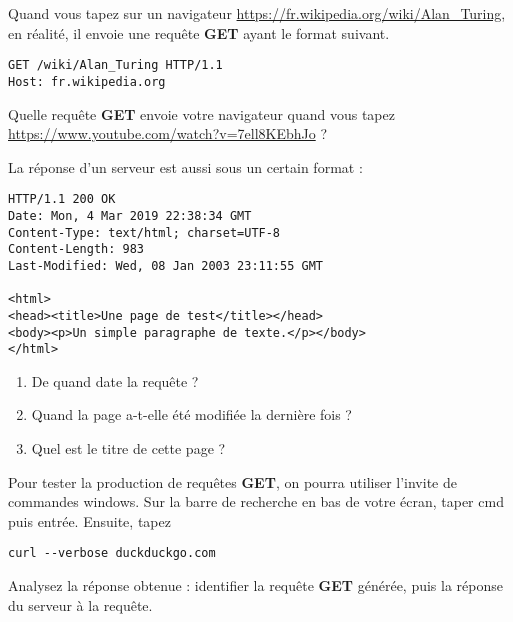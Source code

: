 \documentclass{article}
\begin{document}
\begin{enumquestions}
\item Quand vous tapez sur un navigateur \url{https://fr.wikipedia.org/wiki/Alan_Turing}, en réalité, il envoie une requête \textbf{GET} ayant le format suivant.
\begin{lstlisting}
GET /wiki/Alan_Turing HTTP/1.1
Host: fr.wikipedia.org
\end{lstlisting}
Quelle requête \textbf{GET} envoie votre navigateur quand vous tapez \url{https://www.youtube.com/watch?v=7ell8KEbhJo} ?
\vspace*{0.3cm}

\emptybox{4cm}
\item La réponse d'un serveur est aussi sous un certain format :
\begin{lstlisting}
HTTP/1.1 200 OK
Date: Mon, 4 Mar 2019 22:38:34 GMT
Content-Type: text/html; charset=UTF-8
Content-Length: 983
Last-Modified: Wed, 08 Jan 2003 23:11:55 GMT

<html>
<head><title>Une page de test</title></head>
<body><p>Un simple paragraphe de texte.</p></body>
</html>
\end{lstlisting}
\begin{enumerate}
\item De quand date la requête ? \answersline
\item Quand la page a-t-elle été modifiée la dernière fois ? \answersline
\item Quel est le titre de cette page ? \answersline 
\end{enumerate}
\item Pour tester la production de requêtes \textbf{GET}, on pourra utiliser l'invite de commandes windows. Sur la barre de recherche en bas de votre écran, taper \og cmd \fg puis entrée. Ensuite, tapez
\begin{lstlisting}
curl --verbose duckduckgo.com
\end{lstlisting}
Analysez la réponse obtenue : identifier la requête \textbf{GET} générée, puis la réponse du serveur à la requête.
\end{enumquestions}
\end{document}
